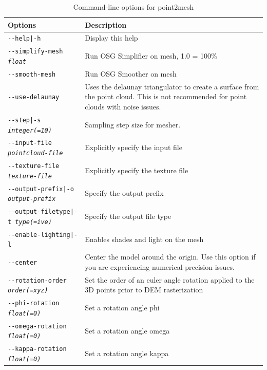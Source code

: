 \begin{longtable}{|l|p{10cm}|}
\caption{Command-line options for point2mesh}
\label{tbl:point2mesh}
\endfirsthead
\endhead
\endfoot
\endlastfoot
\hline
Options & Description \\ \hline \hline
\texttt{-\/-help|-h} & Display this help \\ \hline
\texttt{-\/-simplify-mesh \textit{float}} & Run OSG Simplifier on mesh, 1.0 = 100\% \\ \hline
\texttt{-\/-smooth-mesh} & Run OSG Smoother on mesh \\ \hline
\texttt{-\/-use-delaunay} & Uses the delaunay triangulator to create a surface from the point cloud. This is not recommended for point clouds with noise issues. \\ \hline
\texttt{-\/-step|-s \textit{integer(=10)}} & Sampling step size for mesher. \\ \hline
\texttt{-\/-input-file \textit{pointcloud-file}} & Explicitly specify the input file \\ \hline
\texttt{-\/-texture-file \textit{texture-file}} & Explicitly specify the texture file \\ \hline
\texttt{-\/-output-prefix|-o \textit{output-prefix}} & Specify the output prefix \\ \hline
\texttt{-\/-output-filetype|-t \textit{type(=ive)}} & Specify the output file type \\ \hline
\texttt{-\/-enable-lighting|-l} & Enables shades and light on the mesh \\ \hline
\texttt{-\/-center} & Center the model around the origin. Use this option if you are experiencing numerical precision issues. \\ \hline
\texttt{-\/-rotation-order \textit{order(=xyz)}} & Set the order of an euler angle rotation applied to the 3D points prior to DEM rasterization \\ \hline
\texttt{-\/-phi-rotation \textit{float(=0)}} & Set a rotation angle phi \\ \hline
\texttt{-\/-omega-rotation \textit{float(=0)}} & Set a rotation angle omega \\ \hline
\texttt{-\/-kappa-rotation \textit{float(=0)}} & Set a rotation angle kappa \\ \hline
\end{longtable}


